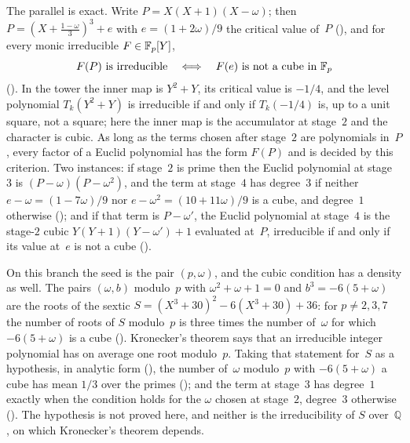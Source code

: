 The parallel is exact.  Write $P=X(X+1)(X-\omega)$; then
$P=(X+\tfrac{1-\omega}{3})^3+e$ with $e=(1+2\omega)/9$ the critical value
of~$P$ (), and for every
monic irreducible $F\in\mathbb{F}_p[Y]$,
\[
  F(P)\ \text{is irreducible}\quad\Longleftrightarrow\quad
  F(e)\ \text{is not a cube in } \mathbb{F}_p
\]
().
In the tower the inner map is $Y^2+Y$, its critical value is $-1/4$, and
the level polynomial $T_k(Y^2+Y)$ is irreducible if and only if
$T_k(-1/4)$ is, up to a unit square, not a square; here the inner map is
the accumulator at stage~$2$ and the character is cubic.  As long as the
terms chosen after stage~$2$ are polynomials in~$P$, every factor of a
Euclid polynomial has the form $F(P)$ and is decided by this criterion.
Two instances: if stage~$2$ is prime then the Euclid polynomial at
stage~$3$ is $(P-\omega)(P-\omega^2)$, and the term at stage~$4$ has
degree~$3$ if neither $e-\omega=(1-7\omega)/9$ nor
$e-\omega^2=(10+11\omega)/9$ is a cube, and degree~$1$ otherwise
(); and if that term is
$P-\omega'$, the Euclid polynomial at stage~$4$ is the stage-$2$ cubic
$Y(Y+1)(Y-\omega')+1$ evaluated at~$P$, irreducible if and only if its
value at~$e$ is not a cube
().

On this branch the seed is the pair $(p,\omega)$, and the cubic condition
has a density as well.  The pairs $(\omega,b)$ modulo~$p$ with
$\omega^2+\omega+1=0$ and $b^3=-6(5+\omega)$ are the roots of the sextic
$S=(X^3+30)^2-6(X^3+30)+36$: for $p\ne2,3,7$ the number of roots of $S$
modulo~$p$ is three times the number of~$\omega$ for which $-6(5+\omega)$
is a cube
().
Kronecker's theorem says that an irreducible integer polynomial has on
average one root modulo~$p$.  Taking that statement for~$S$ as a
hypothesis, in analytic form
(), the number
of~$\omega$ modulo~$p$ with $-6(5+\omega)$ a cube has mean $1/3$ over the
primes (); and the
term at stage~$3$ has degree~$1$ exactly when the condition holds for the
$\omega$ chosen at stage~$2$, degree~$3$ otherwise
().
The hypothesis is not proved here, and neither is the irreducibility of
$S$ over~$\mathbb{Q}$, on which Kronecker's theorem depends.

